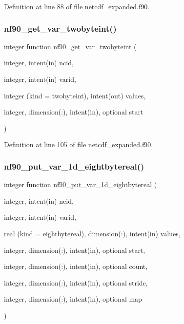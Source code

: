 Definition at line 88 of file netcdf\+\_\+expanded.\+f90.

\mbox{\label{netcdf__expanded_8f90_a69641a19fcce3c8bf20336b42d01826d}} 
\subsubsection{\texorpdfstring{nf90\+\_\+get\+\_\+var\+\_\+twobyteint()}{nf90\_get\_var\_twobyteint()}}
{\footnotesize\ttfamily integer function nf90\+\_\+get\+\_\+var\+\_\+twobyteint (\begin{DoxyParamCaption}\item[{integer, intent(in)}]{ncid,  }\item[{integer, intent(in)}]{varid,  }\item[{integer (kind = twobyteint), intent(out)}]{values,  }\item[{integer, dimension(\+:), intent(in), optional}]{start }\end{DoxyParamCaption})}



Definition at line 105 of file netcdf\+\_\+expanded.\+f90.

\mbox{\label{netcdf__expanded_8f90_ae46f0be9c41a4c9c02f471efa43cd2fe}} 
\subsubsection{\texorpdfstring{nf90\+\_\+put\+\_\+var\+\_\+1d\+\_\+eightbytereal()}{nf90\_put\_var\_1d\_eightbytereal()}}
{\footnotesize\ttfamily integer function nf90\+\_\+put\+\_\+var\+\_\+1d\+\_\+eightbytereal (\begin{DoxyParamCaption}\item[{integer, intent(in)}]{ncid,  }\item[{integer, intent(in)}]{varid,  }\item[{real (kind = eightbytereal), dimension(\+:), intent(in)}]{values,  }\item[{integer, dimension(\+:), intent(in), optional}]{start,  }\item[{integer, dimension(\+:), intent(in), optional}]{count,  }\item[{integer, dimension(\+:), intent(in), optional}]{stride,  }\item[{integer, dimension(\+:), intent(in), optional}]{map }\end{DoxyParamCaption})}



